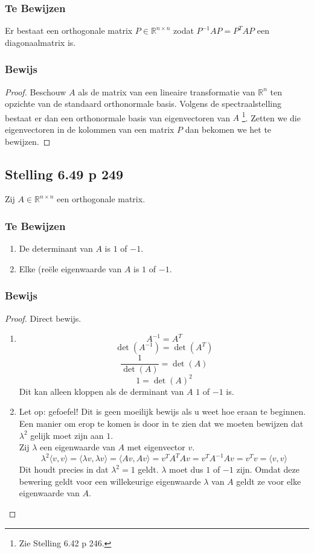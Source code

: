 \documentclass[lineaire_algebra_oplossingen.tex]{subfiles}
\begin{document}
\subsubsection*{Te Bewijzen}
Er bestaat een orthogonale matrix $P\in \mathbb{R}^{n\times n}$ zodat $P^{-1}AP = P^TAP$ een diagonaalmatrix is.

\subsubsection*{Bewijs}
\begin{proof}
Beschouw $A$ als de matrix van een lineaire transformatie van $\mathbb{R}^n$ ten opzichte van de standaard orthonormale basis.
Volgens de spectraalstelling bestaat er dan een orthonormale basis van eigenvectoren van $A$ \footnote{Zie Stelling 6.42 p 246.}.
Zetten we die eigenvectoren in de kolommen van een matrix $P$ dan bekomen we het te bewijzen.
\end{proof}


\subsection{Stelling 6.49 p 249}
\label{6.49}
Zij $A\in \mathbb{R}^{n\times n}$ een orthogonale matrix.

\subsubsection*{Te Bewijzen}
\begin{enumerate}
\item De determinant van $A$ is $1$ of $-1$.
\item Elke (re\"ele eigenwaarde van $A$ is $1$ of $-1$.
\end{enumerate}

\subsubsection*{Bewijs}
\begin{proof}
Direct bewijs.
\begin{enumerate}
\item
\[
A^{-1} = A^T
\]
\[
\det(A^{-1}) = \det(A^T)
\]
\[
\frac{1}{\det(A)} = \det(A)
\]
\[
1 = \det(A)^2
\]
Dit kan alleen kloppen als de derminant van $A$ $1$ of $-1$ is.

\item
Let op: gefoefel! Dit is geen  moeilijk bewijs als u weet hoe eraan te beginnen. Een manier om erop te komen is door in te zien dat we moeten bewijzen dat $\lambda^2$ gelijk moet zijn aan $1$.\\
Zij $\lambda$ een eigenwaarde van $A$ met eigenvector $v$.
\[
\lambda^2\langle v,v\rangle = \langle \lambda v,\lambda v\rangle = \langle A v,A v\rangle = v^TA^T A v = v^TA^{-1} A v = v^Tv = \langle v, v \rangle
\]
Dit houdt precies in dat $\lambda^2 = 1$ geldt. $\lambda$ moet dus $1$ of $-1$ zijn. Omdat deze bewering geldt voor een willekeurige eigenwaarde $\lambda$ van $A$ geldt ze voor elke eigenwaarde van $A$.
\end{enumerate}
\end{proof}
\end{document}
